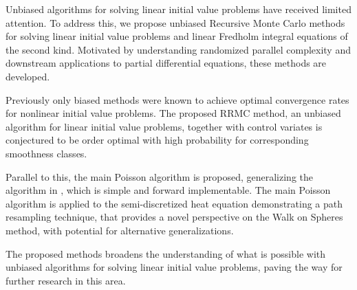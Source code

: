 Unbiased algorithms for solving linear initial value problems have received limited attention.
To address this, we propose unbiased Recursive Monte Carlo methods for solving
linear initial value problems and linear Fredholm integral equations of the second kind. Motivated
by understanding randomized parallel complexity and downstream applications to partial differential
equations, these methods are developed.

Previously only biased methods were known to achieve optimal convergence rates for nonlinear
initial value problems.
The proposed RRMC method, an unbiased algorithm for linear initial value problems,
together with control variates is conjectured to be order optimal with high
probability for corresponding smoothness classes.

Parallel to this, the main Poisson algorithm is proposed, generalizing the algorithm in \cite{acebron_monte_2016},
which is simple and forward implementable. The main Poisson algorithm is applied
to the semi-discretized heat equation demonstrating a path resampling technique, that provides
a novel perspective on the Walk on Spheres method, with potential for alternative generalizations.

The proposed methods broadens the understanding of what is possible with unbiased algorithms for
solving linear initial value problems, paving the way for further research in this area.